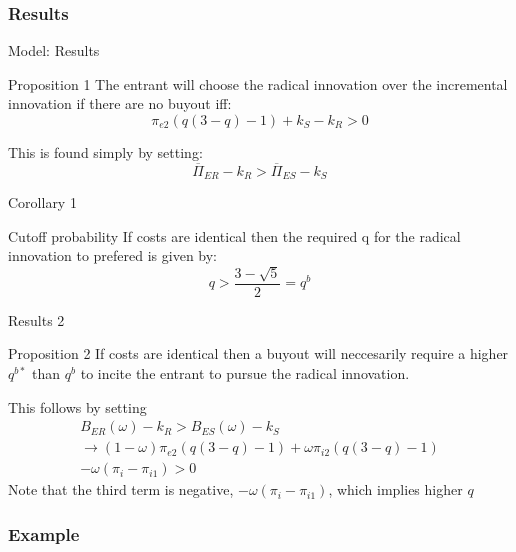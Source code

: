 \documentclass{beamer}
\begin{document}
\subsubsection{Results}

\begin{frame}{Model: Results}
\begin{block}{Proposition 1}
The entrant will choose the radical innovation over the incremental innovation if there are no buyout iff: 
\begin{equation*}
\pi_{e2}(q(3-q)-1)+k_S-k_R > 0
\end{equation*}
\end{block}
This is found simply by setting:
\begin{equation*}
\overline{\Pi}_{ER}-k_R > \overline{\Pi}_{ES}-k_S 
\end{equation*}
\end{frame}


\begin{frame}{Corollary 1}
\begin{block}{Cutoff probability}
If costs are identical then the required q for the radical innovation to prefered is given by: 
\begin{equation*}
q > \frac{3-\sqrt{5}}{2}=q^{b}
\end{equation*}
\end{block}
\end{frame}

\begin{frame}{Results 2}
\begin{block}{Proposition 2}
If costs are identical then a buyout will neccesarily require a higher $q^{b*}$ than $q^b$ to incite the entrant to pursue the radical innovation. 
\end{block}
This follows by setting 
\begin{align*}
B_{ER}(\omega)-k_R>B_{ES}(\omega)-k_S \\
\rightarrow (1-\omega) \pi_{e2}(q(3-q)-1)
+ \omega \pi_{i2} (q(3-q)-1) \\  -\omega(\pi_i- \pi_{i1})
> 0
\end{align*}
Note that the third term is negative, $-\omega(\pi_i- \pi_{i1})$, which implies higher $q$
\end{frame}

\subsubsection{Example}
\end{document}
